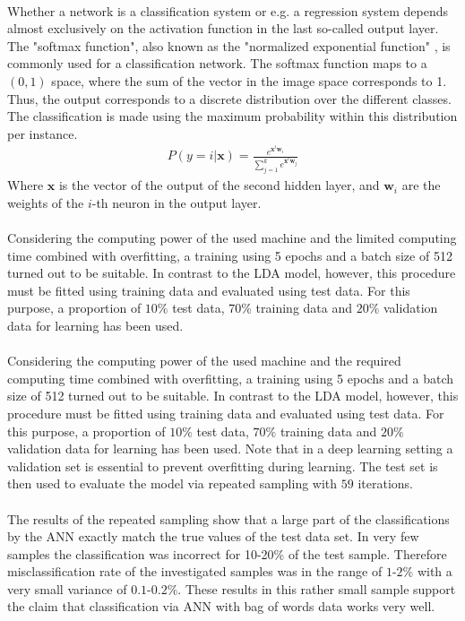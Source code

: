 \documentclass[11pt,a4paper]{article}
\begin{document}
\ \\
Whether a network is a classification system or e.g. a regression system depends almost exclusively on the activation function in the last so-called output layer. The "softmax function", also known as the "normalized exponential function" \cite[p. 115]{Bishop2006}, is commonly used for a classification network. The softmax function maps to a $(0,1)$ space, where the sum of the vector in the image space corresponds to 1. Thus, the output corresponds to a discrete distribution over the different classes. The classification is made using the maximum probability within this distribution per instance.
\begin{align}
	P(y=i|\textbf{x})=\frac{e^{\textbf{x}^t\textbf{w}_i}}{\sum_{j=1}^ke^{\textbf{x}^t\textbf{w}_j}}
\end{align}
Where $\textbf{x}$ is the vector of the output of the second hidden layer, and $\textbf{w}_i$ are the weights of the $i$-th neuron in the output layer.\\
\ \\
Considering the computing power of the used machine and the limited computing time combined with overfitting, a training using 5 epochs and a batch size of 512 turned out to be suitable. In contrast to the LDA model, however, this procedure must be fitted using training data and evaluated using test data. For this purpose, a proportion of $10\%$ test data, $70\%$ training data and $20\%$ validation data for learning has been used.\\
\ \\
Considering the computing power of the used machine and the required computing time combined with overfitting, a training using 5 epochs and a batch size of 512 turned out to be suitable. In contrast to the LDA model, however, this procedure must be fitted using training data and evaluated using test data. For this purpose, a proportion of $10\%$ test data, $70\%$ training data and $20\%$ validation data for learning has been used. Note that in a deep learning setting a validation set is essential to prevent overfitting during learning. The test set is then used to evaluate the model via repeated sampling with $59$ iterations.\\
\ \\
The results of the repeated sampling show that a large part of the classifications by the ANN exactly match the true values of the test data set. In very few samples the classification was incorrect for 10-20\% of the test sample. Therefore misclassification rate of the investigated samples was in the range of $1$-$2\%$ with a very small variance of $0.1$-$0.2\%$. These results in this rather small sample support the claim that classification via ANN with bag of words data works very well.\\
\end{document}
